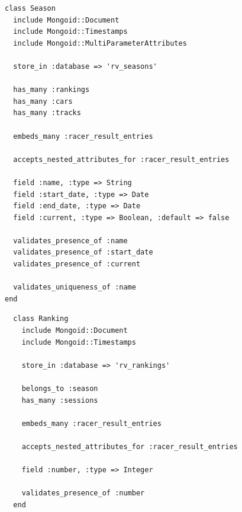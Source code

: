 \begin{listing}
  \begin{verbatim}
class Season
  include Mongoid::Document
  include Mongoid::Timestamps
  include Mongoid::MultiParameterAttributes
  
  store_in :database => 'rv_seasons'
  
  has_many :rankings
  has_many :cars
  has_many :tracks
  
  embeds_many :racer_result_entries
  
  accepts_nested_attributes_for :racer_result_entries
  
  field :name, :type => String
  field :start_date, :type => Date
  field :end_date, :type => Date
  field :current, :type => Boolean, :default => false
  
  validates_presence_of :name
  validates_presence_of :start_date
  validates_presence_of :current
  
  validates_uniqueness_of :name
end
  \end{verbatim}
\end{listing}

\begin{listing}
  \begin{verbatim}
  class Ranking
    include Mongoid::Document
    include Mongoid::Timestamps
    
    store_in :database => 'rv_rankings'
    
    belongs_to :season
    has_many :sessions
    
    embeds_many :racer_result_entries
    
    accepts_nested_attributes_for :racer_result_entries
    
    field :number, :type => Integer
    
    validates_presence_of :number
  end
  \end{verbatim}
\end{listing}

